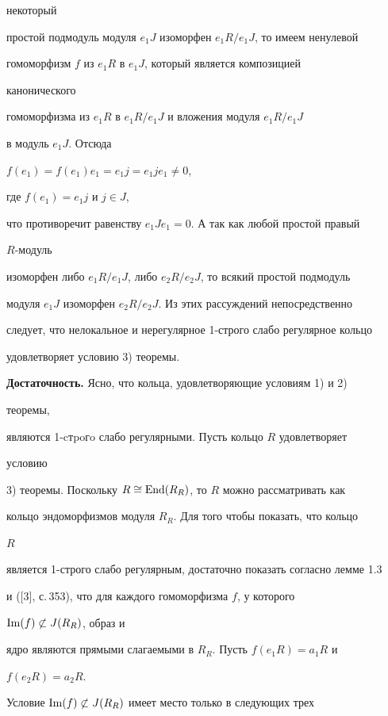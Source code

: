 некоторый  


простой подмодуль модуля $e_1J$ изоморфен $e_1R/e_1J$, то имеем ненулевой  


гомоморфизм $f$ из $e_1R$ в $e_1J$, который является композицией 


канонического  


гомоморфизма из $e_1R$ в $e_1R/e_1J$ и вложения модуля $e_1R/e_1J$  


в модуль $e_1J$. Отсюда 


$f(e_1)=f(e_1)e_1= e_1j=e_1je_1\ne0$, 


где $f(e_1)=e_1j$ и $j\in J$, 


что противоречит равенству $e_1Je_1=0$. А так как любой простой правый 


$R$-модуль  


изоморфен либо $e_1R/e_1J$, либо $e_2R/e_2J$, то всякий простой подмодуль  


модуля $e_1J$ изоморфен $e_2R/e_2J$. Из этих рассуждений непосредственно  


следует, что нелокальное и нерегулярное 1-строго слабо регулярное кольцо  


удовлетворяет условию 3) теоремы. 


\medskip 


 


{\bf Достаточность.} Ясно, что кольца, удовлетворяющие условиям 1) и 2) 


теоремы, 


являются 1-cтpoгo слабо регулярными. Пусть кольцо $R$ удовлетворяет 


условию 


3) теоремы. Поскольку $R\cong\operatorname{End}(R_R)$, то $R$ можно рассматривать как 


кольцо эндоморфизмов модуля $R_R$. Для того чтобы показать, что кольцо 


$R$ 


является 1-строго слабо регулярным, достаточно показать согласно лемме 1.3  


и ([3], с.\,353), что для каждого гомоморфизма $f$, у которого 


$\operatorname{Im}(f)\not\subset J(R_R)$, образ и  


ядро являются прямыми слагаемыми в $R_R$. Пусть $f(e_1R)=a_1R$ и 


$f(e_2R)=a_2R$. 


 


Условие $\operatorname{Im}(f)\not\subset J(R_R)$ имеет место только в следующих трех 


